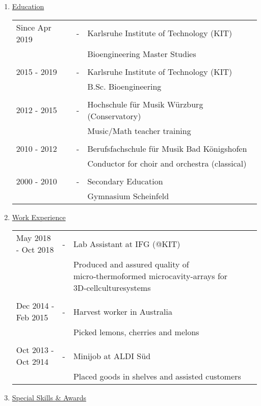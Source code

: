 
\begin{enumerate}[label=\Alph*.]
	\item \underline{Education}
	
	\begin{tabulary}{\textwidth}{@{}p{3.8cm} C L}
		Since Apr 2019 & - & Karlsruhe Institute of Technology (KIT) \\
		& & Bioengineering Master Studies \\
		\\[-0.5em]
		2015 - 2019 & - & Karlsruhe Institute of Technology (KIT) \\
		& & B.Sc. Bioengineering \\
		\\[-0.5em]
		2012 - 2015 & - & Hochschule für Musik Würzburg (Conservatory) \\
		& & Music/Math teacher training \\
		\\[-0.5em]
		2010 - 2012 & - & Berufsfachschule für Musik Bad Königshofen \\
		& & Conductor for choir and orchestra (classical) \\
		\\[-0.5em]
		2000 - 2010 & - & Secondary Education \\
		& & Gymnasium Scheinfeld \\
	\end{tabulary}
	
	\item \underline{Work Experience}
	
	\begin{tabulary}{\textwidth}{@{}p{3.8cm}CL}
		May 2018 - Oct 2018 & - & Lab Assistant at IFG (@KIT) \\
		& & Produced and assured quality of micro‑thermoformed \newline microcavity-arrays for 3D‑cellculturesystems\\
		\\[-0.5em]
		Dec 2014 - Feb 2015 & - & Harvest worker in Australia \\
		& & Picked lemons, cherries and melons  \\
		\\[-0.5em]
		Oct 2013 - Oct 2914 & - & Minijob at ALDI Süd \\
		& & Placed goods in shelves and assisted customers  \\
	\end{tabulary}
	
	\pagebreak
	\item \underline{Special Skills \& Awards}
	

\end{enumerate}

